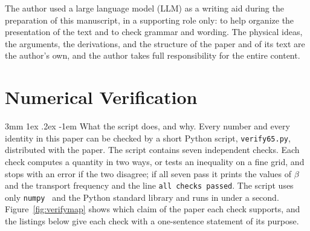 \documentclass[%
 reprint, amsmath,amssymb, aps, prb, ]{revtex4-2}
\makeatletter
\numberwithin{equation}{section}
\renewcommand\paragraph{%
  \@startsection{paragraph}{4}{\z@}%
    {3mm \@plus 1ex \@minus .2ex}
    {-1em}
    {\normalfont\normalsize\itshape}}
\makeatother
\begin{document}
\begin{acknowledgments}
The author used a large language model (LLM) as a writing aid during the preparation of this manuscript, in a supporting role only: to help organize the presentation of the text and to check grammar and wording. The physical ideas, the arguments, the derivations, and the structure of the paper and of its text are the author's own, and the author takes full responsibility for the entire content.
\end{acknowledgments}

\appendix

\section{Numerical Verification}
\label{app:numeric}

\paragraph{What the script does, and why.} Every number and every identity in this paper can be checked by a short Python script, \texttt{verify65.py}, distributed with the paper. The script contains seven independent checks. Each check computes a quantity in two ways, or tests an inequality on a fine grid, and stops with an error if the two disagree; if all seven pass it prints the values of $\beta$ and the transport frequency and the line \texttt{all checks passed}. The script uses only \texttt{numpy}~\cite{ref:numpy} and the Python standard library and runs in under a second. Figure~\ref{fig:verifymap} shows which claim of the paper each check supports, and the listings below give each check with a one-sentence statement of its purpose.
\end{document}
